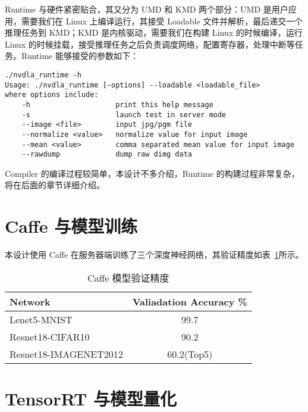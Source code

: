 Runtime 与硬件紧密贴合，其又分为 UMD 和 KMD 两个部分：UMD 是用户应用，需要我们在 Linux 上编译运行，其接受 Loadable 文件并解析，最后递交一个推理任务到 KMD；KMD 是内核驱动，需要我们在构建 Linux 的时候编译，运行 Linux 的时候挂载，接受推理任务之后负责调度网络，配置寄存器，处理中断等任务。Runtime 能够接受的参数如下：

\begin{lstlisting}
./nvdla_runtime -h
Usage: ./nvdla_runtime [-options] --loadable <loadable_file>
where options include:
    -h                    print this help message
    -s                    launch test in server mode
    --image <file>        input jpg/pgm file
    --normalize <value>   normalize value for input image
    --mean <value>        comma separated mean value for input image
    --rawdump             dump raw dimg data
\end{lstlisting}

Compiler 的编译过程较简单，本设计不多介绍，Runtime 的构建过程非常复杂，将在后面的章节详细介绍。

\section{Caffe 与模型训练}

本设计使用 Caffe 在服务器端训练了三个深度神经网络，其验证精度如表~\ref{tab:Vertification}所示。

\begin{table}[!htbp]
    \caption{Caffe 模型验证精度}
    \label{tab:Vertification}
    \centering
    \footnotesize%
    \setlength{\tabcolsep}{4pt}%
    \renewcommand{\arraystretch}{1.2}%
    \begin{tabular}{lc}
        \toprule
        \textbf{Network}      & \multicolumn{1}{l}{\textbf{Valiadation Accuracy \%}}\\
        \midrule
        Lenet5-MNIST          & 99.7                                                \\
        Resnet18-CIFAR10      & 90.2                                                \\
        Resnet18-IMAGENET2012 & 60.2(Top5)                                          \\
        \bottomrule                   
    \end{tabular}
\end{table}

\section{TensorRT 与模型量化}

